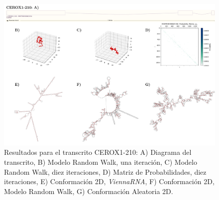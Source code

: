 \documentclass[a4paper,11pt,titlepage]{article}
\theoremstyle{definition}
\begin{document}
\begin{figure}[H]
    \centering
    \includegraphics[width=\textwidth]{images/CEROX1-210_full.png}
    \small{\caption{Resultados para el transcrito CEROX1-210: A) Diagrama del transcrito, B) Modelo Random Walk, una iteración, C) Modelo Random Walk, diez iteraciones, D) Matriz de Probabilidades, diez iteraciones, E) Conformación 2D, \textit{ViennaRNA}, F) Conformación 2D, Modelo Random Walk, G) Conformación Aleatoria 2D.}}\normalsize
    \label{fig:CEROX1-210-diag}
\end{figure}
\end{document}
